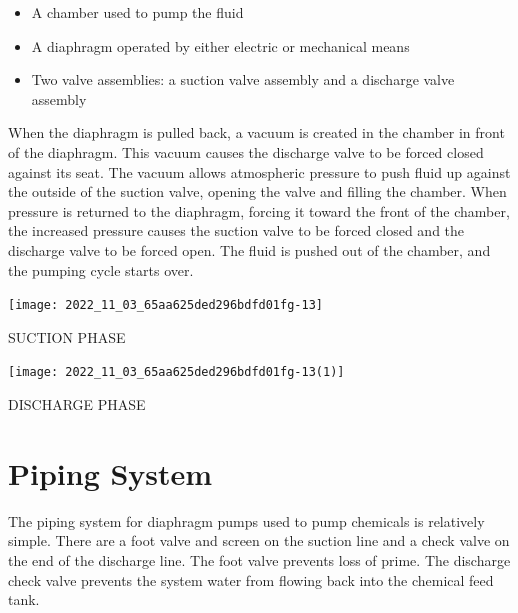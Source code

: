 \documentclass[10pt]{article}
\begin{document}
\begin{itemize}
  \item A chamber used to pump the fluid

  \item A diaphragm operated by either electric or mechanical means

  \item Two valve assemblies: a suction valve assembly and a discharge valve assembly

\end{itemize}
When the diaphragm is pulled back, a vacuum is created in the chamber in front of the diaphragm. This vacuum causes the discharge valve to be forced closed against its seat. The vacuum allows atmospheric pressure to push fluid up against the outside of the suction valve, opening the valve and filling the chamber. When pressure is returned to the diaphragm, forcing it toward the front of the chamber, the increased pressure causes the suction valve to be forced closed and the discharge valve to be forced open. The fluid is pushed out of the chamber, and the pumping cycle starts over.

\texttt{[image: 2022\_11\_03\_65aa625ded296bdfd01fg-13]}

SUCTION PHASE

\texttt{[image: 2022\_11\_03\_65aa625ded296bdfd01fg-13(1)]}

DISCHARGE PHASE

\section{Piping System}
The piping system for diaphragm pumps used to pump chemicals is relatively simple. There are a foot valve and screen on the suction line and a check valve on the end of the discharge line. The foot valve prevents loss of prime. The discharge check valve prevents the system water from flowing back into the chemical feed tank.
\end{document}
